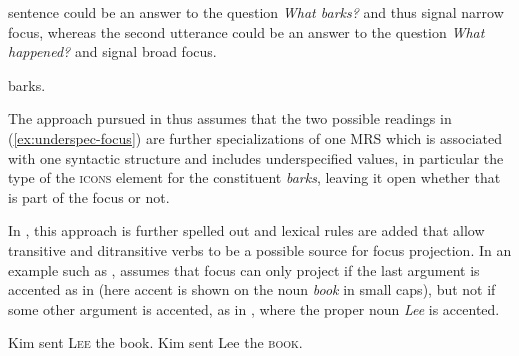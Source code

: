 \documentclass[output=paper
                ,modfonts
                ,nonflat
	        ,collection
	        ,collectionchapter
	        ,collectiontoclongg
 	        ,biblatex
                ,babelshorthands
                ,newtxmath
                ,draftmode
                ,colorlinks, citecolor=brown
]{./langsci/langscibook}
\begin{document}
sentence could be an answer to the question \textit{What barks?} and
thus signal narrow focus, whereas the second utterance could be an answer
to the question \textit{What happened?} and signal broad focus.
\begin{exe}
  \ex\label{ex:underspec-focus}
  \begin{xlist}
     barks.
  \end{xlist}
\end{exe}
The approach pursued in \cite{song-bender:2012} thus assumes that the
two possible readings in (\ref{ex:underspec-focus}) are further
specializations of one MRS which is associated with one syntactic
structure and includes underspecified values, in particular the type
of the \textsc{icons} element for the constituent \textit{barks},
leaving it open whether that is part of the focus or not.

In \cite{song2018}, this approach is further spelled out and lexical
rules are added that allow transitive and ditransitive verbs to be a possible
source for focus projection. In an example such as
, \cite{song2018} assumes that focus can
only project if the last argument is accented as in
 (here accent is shown on the noun \textit{book} in
  small caps), but not if some other argument is accented, as in
  , where the proper noun \textit{Lee}
  is accented.

\begin{exe}
  \ex\label{ex:song-ditrans-focus}
  \begin{xlist}
    \ex Kim sent  \textsc{Lee} the book.\label{ex:song-ditrans-focus-a}
    \ex Kim sent Lee the \textsc{book}.\label{ex:song-ditrans-focus-b}
  \end{xlist}
\end{exe}
\end{document}
